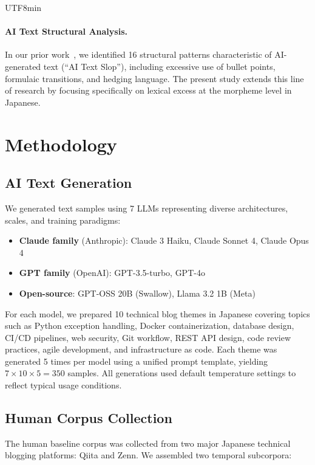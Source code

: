 \documentclass[11pt,a4paper]{article}
\begin{document}
\begin{CJK}{UTF8}{min}
\paragraph{AI Text Structural Analysis.}
In our prior work~\citep{imoto2025slop}, we identified 16 structural patterns characteristic of AI-generated text (``AI Text Slop''), including excessive use of bullet points, formulaic transitions, and hedging language. The present study extends this line of research by focusing specifically on lexical excess at the morpheme level in Japanese.

\section{Methodology}

\subsection{AI Text Generation}

We generated text samples using 7 LLMs representing diverse architectures, scales, and training paradigms:

\begin{itemize}
    \item \textbf{Claude family} (Anthropic): Claude 3 Haiku, Claude Sonnet 4, Claude Opus 4
    \item \textbf{GPT family} (OpenAI): GPT-3.5-turbo, GPT-4o
    \item \textbf{Open-source}: GPT-OSS 20B (Swallow), Llama 3.2 1B (Meta)
\end{itemize}

For each model, we prepared 10 technical blog themes in Japanese covering topics such as Python exception handling, Docker containerization, database design, CI/CD pipelines, web security, Git workflow, REST API design, code review practices, agile development, and infrastructure as code. Each theme was generated 5 times per model using a unified prompt template, yielding $7 \times 10 \times 5 = 350$ samples. All generations used default temperature settings to reflect typical usage conditions.

\subsection{Human Corpus Collection}

The human baseline corpus was collected from two major Japanese technical blogging platforms: Qiita and Zenn. We assembled two temporal subcorpora:


\end{CJK}
\end{document}
